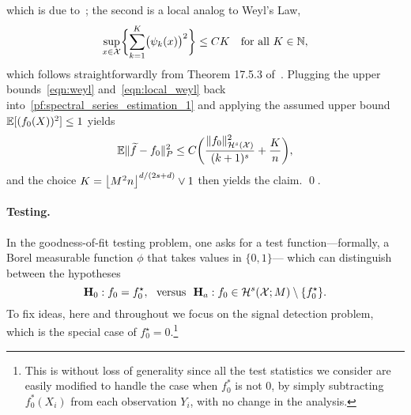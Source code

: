 which is due to~\cite{dunlop2020}; the second is a local analog to Weyl's Law,
\begin{equation}
\label{eqn:local_weyl}
\sup_{x \in \mathcal{X}}\biggl\{\sum_{k = 1}^{K} \bigl(\psi_k(x)\bigr)^2\biggr\} \leq CK \quad\textrm{for all $K \in \mathbb{N}$},
\end{equation}
which follows straightforwardly from Theorem 17.5.3 of~\cite{hormander1973}. Plugging the upper bounds~\eqref{eqn:weyl} and~\eqref{eqn:local_weyl} back into~\eqref{pf:spectral_series_estimation_1} and applying the assumed upper bound $\mathbb{E}[(f_0(X))^2] \leq 1$ yields
\begin{equation*}
\mathbb{E} \|\widetilde{f} - f_0\|_P^2 \leq C\biggl(\frac{\|f_0\|_{\mathcal{H}^s(\mathcal{X})}^2}{(k + 1)^s} + \frac{K}{n}\biggr),
\end{equation*}
and the choice $K = \left\lfloor M^2n \right\rfloor^{d/(2s + d)} \vee 1$ then yields the claim.
\qed.

\paragraph{Testing.}
In the goodness-of-fit testing problem, one asks for a test function---formally, a Borel measurable function $\phi$ that takes values in $\{0,1\}$--- which can distinguish between the hypotheses
\begin{equation}
\mathbf{H}_0: f_0 = f_0^{\star}, ~~\textrm{versus}~~ \mathbf{H}_a: f_0 \in \mathcal{H}^{s}(\mathcal{X};M) \setminus \{f_0^{\star}\}.
\end{equation} 
To fix ideas, here and throughout we focus on the signal detection problem, which is the special case of $f_0^{\star} = 0$.\footnote{This is without loss of generality since all the test statistics we consider are easily modified to handle the case when $f_0^{\ast}$ is not $0$, by simply subtracting $f_0^{\ast}(X_i)$ from each observation $Y_i$, with no change in the analysis.}

